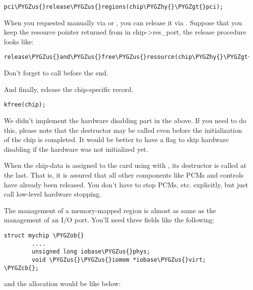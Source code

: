 \documentclass[a4paper,8pt,english]{sphinxmanual}
\def\PYGZus{\char`\_}
\def\PYGZob{\char`\{}
\def\PYGZcb{\char`\}}
\def\PYGZgt{\char`\>}
\def\PYGZhy{\char`\-}
\begin{document}
\begin{Verbatim}[commandchars=\\\{\}]
pci\PYGZus{}release\PYGZus{}regions(chip\PYGZhy{}\PYGZgt{}pci);
\end{Verbatim}

When you requested manually via  or
, you can release it via
. Suppose that you keep the resource
pointer returned from  in
chip-\textgreater{}res\_port, the release procedure looks like:

\begin{Verbatim}[commandchars=\\\{\}]
release\PYGZus{}and\PYGZus{}free\PYGZus{}resource(chip\PYGZhy{}\PYGZgt{}res\PYGZus{}port);
\end{Verbatim}

Don't forget to call  before the
end.

And finally, release the chip-specific record.

\begin{Verbatim}[commandchars=\\\{\}]
kfree(chip);
\end{Verbatim}

We didn't implement the hardware disabling part in the above. If you
need to do this, please note that the destructor may be called even
before the initialization of the chip is completed. It would be better
to have a flag to skip hardware disabling if the hardware was not
initialized yet.

When the chip-data is assigned to the card using
 with  , its
destructor is called at the last. That is, it is assured that all other
components like PCMs and controls have already been released. You don't
have to stop PCMs, etc. explicitly, but just call low-level hardware
stopping.

The management of a memory-mapped region is almost as same as the
management of an I/O port. You'll need three fields like the
following:

\begin{Verbatim}[commandchars=\\\{\}]
struct mychip \PYGZob{}
        ....
        unsigned long iobase\PYGZus{}phys;
        void \PYGZus{}\PYGZus{}iomem *iobase\PYGZus{}virt;
\PYGZcb{};
\end{Verbatim}

and the allocation would be like below:
\end{document}

